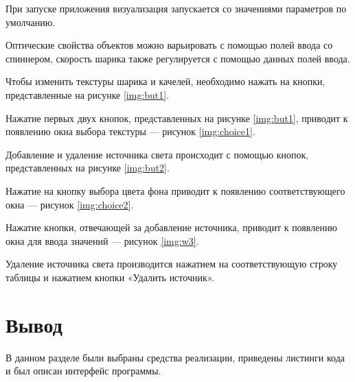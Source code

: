 При запуске приложения визуализация запускается со значениями параметров по умолчанию.

Оптические свойства объектов можно варьировать с помощью полей ввода со спиннером, скорость шарика также регулируется с помощью данных полей ввода.

Чтобы изменить текстуры шарика и качелей, необходимо нажать на кнопки, представленные на рисунке \ref{img:but1}.


Нажатие первых двух кнопок, представленных на рисунке \ref{img:but1}, приводит к появлению окна выбора текстуры --- рисунок \ref{img:choice1}.


Добавление и удаление источника света происходит с помощью кнопок, представленных на рисунке \ref{img:but2}.

\pagebreak

Нажатие на кнопку выбора цвета фона приводит к появлению соответствующего окна --- рисунок \ref{img:choice2}.


Нажатие кнопки, отвечающей за добавление источника, приводит к появлению окна для ввода значений --- рисунок \ref{img:w3}.

\pagebreak

Удаление источника света производится нажатием на соответствующую строку таблицы и нажатием кнопки «Удалить источник».

\section*{Вывод}

В данном разделе были выбраны средства реализации, приведены листинги кода и был описан интерфейс программы.
